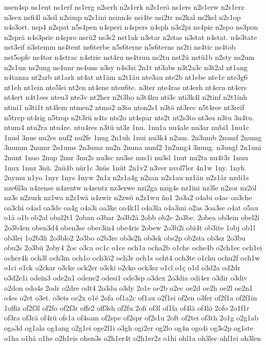 {nsen4sp
ns1ent
ns1erf
ns1erg
n2serh
n2s1erk
n2s1erö
ns1ers
n2s1erw
n2s1erz
n3sex
nsfi4l
n3sil
n2simp
n2s1ini
nsinn4s
nsi4te
nsi2tr
ns2kal
ns2kel
n2s1op
n4s3ort.
nsp4
n2spat
n5s4pen
n4speri
n4spers
n4sph
n3s2pi
ns4pie
n2spo
ns3pon
n2sprä
n4s3prie
n4spro
nsrü2
ns3s2
nst1ak
n3star
n2stas
n3stat
n4stat.
n4s3tate
nst3eif
n3stemm
ns4tent
ns6terbe
n5s6terne
n5s6terns
ns2ti
ns4tic
ns4tob
nst5opfe
ns4tor
n4strac
n4strie
nst4ru
ns4trun
ns2tu
nst2ü
nstü1b
n2sty
ns2um
n2s1un
ns2ung
ns4unr
ns4uns
n3sy
n4s3zi
2n1t
nt3abs
n3t2a3c
n3t2al
nt1ang
n4tanza
nt2arb
nt1ark
nt4at
nt1äm
n2t1äu
nte3au
nte2b
nt1ebe
nte1e
nte3g6
nt1eh
nt1ein
nte5lei
nt2en
nt4ene
nten6te.
n3ter
nte4ras
nt4erh
nt4ern
nt4ers
nt4ert
n4t1ess
nteu3
nte3v
nt2her
n2t3ho
n3t4hu
nti3c
nti3k4l
n2tinf
n2t1inh
ntini1
n3ti1t
nt4lem
ntmen2
ntmo2
n3to
nton2s1
n3tö
nt3rec
n5t4ree
nt3reif
n5trep
nt4rig
n5trop
n2t3rü
n4ts
nts2o
nt4spar
nts2t
nt2s3to
nt3su
n3tu
3n4tu.
ntum4
ntu2ra
ntu4re.
ntu4res
n3tü
nt3z
1nu.
1nu1a
nu4ale
nu3ar
nubi1
1nu1c
1nud
3nue
nu2es
nuf2
nu2fe
1nug
2n1uh
1nui
nu3k4
n2um.
2n3umb
2numf
2numg
3numm
2numr
2n1ums
2n3umz
nu2n
2nuna
nunf2
1n2ung4
3nung.
n3ungl
2n1uni
2nunt
1nuo
2nup
2nur
3nu2s
nu3sc
nu3se
nus1i
nu3sl
1nut
nu2ta
nu4t3r
1nuu
1nux
1nuz
3nü.
2nü4b
nür1c
3nüs
1nüt
2n1v2
n3ver
nvol7ler
4n1w
1ny.
1nyh
2nymu
n1yo
1nyr
1nys
1nyw
2n1z
n2z1a4g
n2zan
n2z1au
nz1än
n2z1är
nzdi1s
nze6l3a
n4zense
n4zentw
n4zentz
nz3erwe
nzi2ga
nzig4s
nz1ini
nz3le
n2zor
nz2öl
nz3s
n2zurk
nz1wa
n2z1wä
n4zwir
n2zwö
n2z1wu
ño1
2o3a2
o4abi
o4ac
oa3che
oa3chi
o4ad
oa3de
oa4g
o4a3i
oa3ke
oa4k1l
o4a3la
o4a3mi
o2as
3oa3se
o4at
o5au
o1ä
o1b
ob2al
obal2t1
2oban
o3bar
2o3b2ä
2obb
ob2e
2o3be.
2obea
ob3ein
obel2i
2o3b4en
oben3d4
oben3se
ober3in4
obe4ris
2obew
2o3b2i
obi4t
ob3ite
1obj
ob1l
ob3lei
1o2b3li
2o3blo2
2o3bo
o2b3re
ob3s2h
ob3sk
obs2p
ob2sta
ob3sz
2o3bu
obu2s
2o3bü
2oby4
2oc
o3ca
oc1c
o1ce
och1a
ocha2b
o1che
oche4b
o2ch1ec
och1ei
ocher4k
och3l
och3m
och1o
och3ö2
och3r
och1s
ocht4
och3te
o1chu
ochu2f
och1w
o1ci
o1ck
o2ckar
o3cke
ock2er
o3cki
o2cko
ock3sz
o1cl
o1ç
o1d
o3d2a
od2dr
o3d2e1i
odein3
ode2n1
odene2
odesi1
ode3sp
o3dex
2o3dia
odi4er
o3dir
o3div
o2don
odo4s
2odr
o2dre
odt4
2o3du
o3dy
2o1e
oe2b
o2ec
oe2d
oe2h
oe2l
oe2n1
o4es
o2et
o3et.
o3ets
oe2x
o1ë
2ofa
of1a2c
of1au
o2f1ei
of2en
o3fer
of2f1a
of2f1in
1offiz
of2f3l
of2fo
of2f3r
offs2
off3sh
of2fu
2ofi
of3l
of1la
of4lä
of4lö
2ofo
2o1f1r
of3ra
of3rä
of4rü
ofs1a
of4sam
of2spe
of2spr
of2s1u
2oft
of2tei
of3th
2o1g
o2g1ab
oga3d
og1ala
og1ang
o2g1ei
oge2l1i
o3gh
ogi2er
og2lo
og4n
ogo4i
og3s2p
og1ste
o1ha
o1hä
o1he
o2h1eis
ohen3s
o2h1er4t
o2h1er2z
o1hi
ohl1a
oh3lec
ohl1ei
oh3len
}
